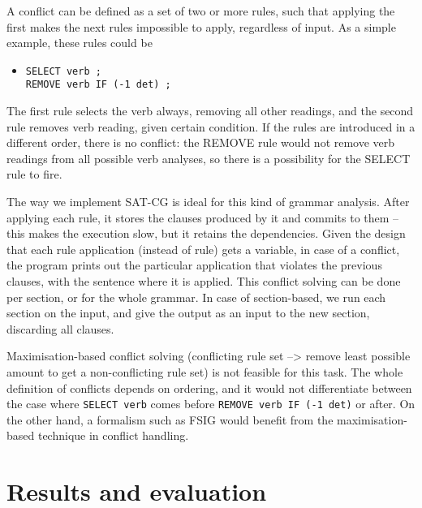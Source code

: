 \documentclass[11pt]{article}
\begin{document}
A conflict can be defined as 
a set of two or more rules, such that applying the first makes the
next rules impossible to apply, regardless of input.
As a simple example, these rules could be

\begin{itemize}
\item [] \texttt{SELECT verb ;} \\
         \texttt{REMOVE verb IF (-1 det) ;}
\end{itemize}

The first rule selects the verb always, removing all other readings,
and the second rule removes verb reading, given certain condition.
If the rules are introduced in a different order, there is no
conflict: the REMOVE rule would not remove verb readings from all
possible verb analyses, so there is a possibility for the SELECT rule
to fire.

The way we implement SAT-CG is ideal for this kind of grammar
analysis. After applying each rule, it stores the clauses produced by
it and commits to them -- this makes the execution slow, but it
retains the dependencies.
Given the design that each rule application (instead of rule) gets a variable,
in case of a conflict, the program prints out the particular
application that violates the previous clauses, with the sentence
where it is applied. 
This conflict solving can be done per section, or for the whole grammar. 
In case of section-based, we run each section on the input, and give
the output as an input to the new section, discarding all clauses.

Maximisation-based conflict solving (conflicting rule set --> remove least
possible amount to get a non-conflicting rule set) is not feasible for this task. 
The whole definition of conflicts depends on ordering, and it would
not differentiate between the case where \texttt{SELECT verb} comes
before \texttt{REMOVE verb IF (-1 det)} or after.
On the other hand, a formalism such as FSIG would benefit from the
maximisation-based technique in conflict handling.






\section{Results and evaluation}
\label{sec:eval}
\end{document}
